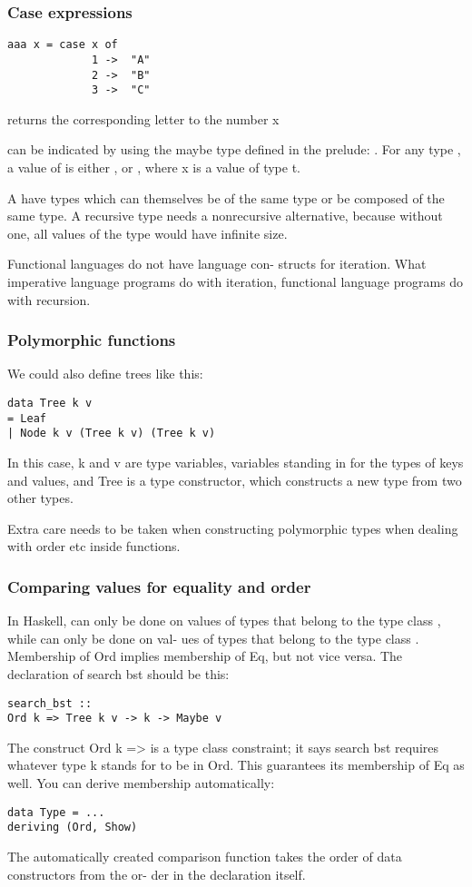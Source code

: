 \subsubsection{Case expressions}
\begin{lstlisting}
aaa x = case x of 
             1 ->  "A"
             2 ->  "B"
             3 ->  "C"
\end{lstlisting}
 returns the corresponding letter to the number x

 can be indicated by using the maybe type defined in the prelude:
.
For any type , a value of  is either
, or , where x is a value of type t.

A  have types which can themselves be of the same type or be composed of the same type.
A recursive type needs a nonrecursive alternative,
because without one, all values of the type would
have infinite size.

Functional languages do not have language con-
structs for iteration. What imperative language
programs do with iteration, functional language
programs do with recursion.

\subsubsection{Polymorphic functions}
We could also define trees like this:
\begin{lstlisting}
data Tree k v
= Leaf
| Node k v (Tree k v) (Tree k v)
\end{lstlisting}
In this case, k and v are type variables, variables
standing in for the types of keys and values, and
Tree is a type constructor, which constructs a new
type from two other types. 

Extra care needs to be taken when constructing polymorphic types when dealing with order etc inside functions.


\subsubsection{Comparing values for equality and order}
In Haskell,  can only be done on
values of types that belong to the type class
, while  can only be done on val-
ues of types that belong to the type class .
Membership of Ord implies membership of Eq, but
not vice versa.
The declaration of search bst should be this:
\begin{lstlisting}
search_bst ::
Ord k => Tree k v -> k -> Maybe v
\end{lstlisting}
The construct Ord k => is a type class constraint;
it says search bst requires whatever type k stands
for to be in Ord. This guarantees its membership
of Eq as well. You can derive membership automatically: 
\begin{lstlisting}
data Type = ...
deriving (Ord, Show)
\end{lstlisting}
The automatically created comparison function
takes the order of data constructors from the or-
der in the declaration itself.

